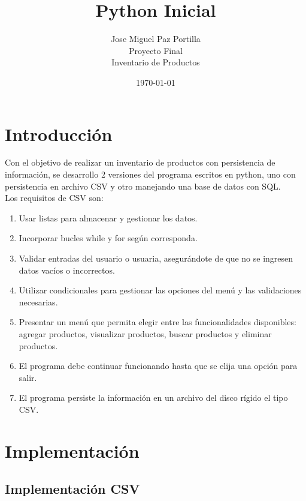 \documentclass[12pt]{article}
\title{Python Inicial}
\author{Jose Miguel Paz Portilla\\Proyecto Final\\Inventario de Productos}
\date{\today}
\begin{document}
\maketitle
\thispagestyle{empty}
\newpage

\tableofcontents
\newpage
\section{Introducción}

Con el objetivo de realizar un inventario de productos con persistencia de información, se desarrollo 2 versiones del programa escritos en python, uno con persistencia en archivo CSV y otro manejando una base de datos con SQL. \\

Los requisitos de CSV son:

\begin{enumerate}
	\item Usar listas para almacenar y gestionar los datos.
	\item Incorporar bucles while y for según corresponda. 
	\item Validar entradas del usuario o usuaria, asegurándote de que no se ingresen datos vacíos o incorrectos.
	\item Utilizar condicionales para gestionar las opciones del menú y las validaciones necesarias.
	\item Presentar un menú que permita elegir entre las funcionalidades disponibles: agregar productos, visualizar productos, buscar productos y eliminar productos.
	\item El programa debe continuar funcionando hasta que se elija una opción para salir.
	\item El programa persiste la información en un archivo del disco rígido el tipo CSV.
\end{enumerate}



\section{Implementación}

\subsection{Implementación CSV}
\end{document}
